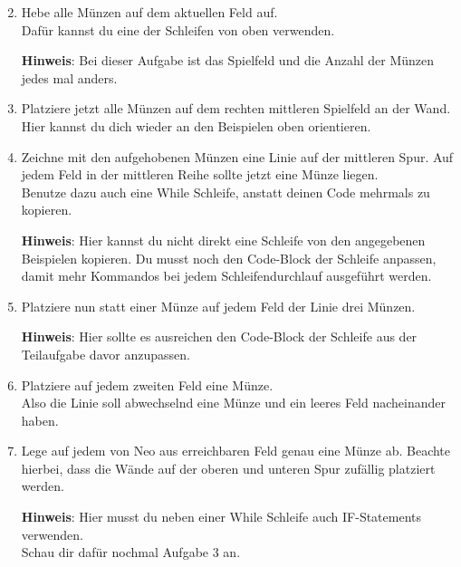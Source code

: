 \begin{enumerate} \setcounter{enumi}{1}
        \item Hebe alle Münzen auf dem aktuellen Feld auf.\\
        Dafür kannst du eine der Schleifen von oben verwenden.

    \textbf{Hinweis}: Bei dieser Aufgabe ist das Spielfeld und die Anzahl der Münzen jedes mal anders.
    \item Platziere jetzt alle Münzen auf dem rechten mittleren Spielfeld an der Wand. 
        Hier kannst du dich wieder an den Beispielen oben orientieren.
    \item Zeichne mit den aufgehobenen Münzen eine Linie auf der mittleren Spur. 
        Auf jedem Feld in der mittleren Reihe sollte jetzt eine Münze liegen.\\
        Benutze dazu auch eine While Schleife, anstatt deinen Code mehrmals zu kopieren.

    \textbf{Hinweis}: Hier kannst du nicht direkt eine Schleife von den angegebenen Beispielen kopieren.
        Du musst noch den Code-Block der Schleife anpassen, damit mehr Kommandos bei jedem Schleifendurchlauf ausgeführt werden.
    \item Platziere nun statt einer Münze auf jedem Feld der Linie drei Münzen.

    \textbf{Hinweis}: Hier sollte es ausreichen den Code-Block der Schleife aus der Teilaufgabe davor anzupassen.
    \item Platziere auf jedem zweiten Feld eine Münze.\\
        Also die Linie soll abwechselnd eine Münze und ein leeres Feld nacheinander haben.
    \item \optional Lege auf jedem von Neo aus erreichbaren Feld genau eine Münze ab. 
        Beachte hierbei, dass die Wände auf der oberen und unteren Spur zufällig platziert werden.

    \textbf{Hinweis}: Hier musst du neben einer While Schleife auch IF-Statements verwenden.\\
        Schau dir dafür nochmal Aufgabe 3 an.
\end{enumerate}
